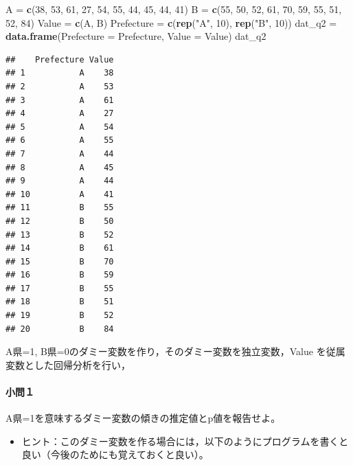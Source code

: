 \documentclass[]{article}
\newenvironment{Shaded}{\begin{snugshade}}{\end{snugshade}}
\newcommand{\KeywordTok}[1]{\textcolor[rgb]{0.13,0.29,0.53}{\textbf{#1}}}
\newcommand{\DataTypeTok}[1]{\textcolor[rgb]{0.13,0.29,0.53}{#1}}
\newcommand{\DecValTok}[1]{\textcolor[rgb]{0.00,0.00,0.81}{#1}}
\newcommand{\StringTok}[1]{\textcolor[rgb]{0.31,0.60,0.02}{#1}}
\newcommand{\NormalTok}[1]{#1}
\providecommand{\tightlist}{%
  \setlength{\itemsep}{0pt}\setlength{\parskip}{0pt}}
\let\oldparagraph\paragraph
\renewcommand{\paragraph}[1]{\oldparagraph{#1}\mbox{}}
\begin{document}
\begin{Shaded}
\begin{Highlighting}[]
\NormalTok{A =}\StringTok{ }\KeywordTok{c}\NormalTok{(}\DecValTok{38}\NormalTok{, }\DecValTok{53}\NormalTok{, }\DecValTok{61}\NormalTok{, }\DecValTok{27}\NormalTok{, }\DecValTok{54}\NormalTok{, }\DecValTok{55}\NormalTok{, }\DecValTok{44}\NormalTok{, }\DecValTok{45}\NormalTok{, }\DecValTok{44}\NormalTok{, }\DecValTok{41}\NormalTok{)}
\NormalTok{B =}\StringTok{ }\KeywordTok{c}\NormalTok{(}\DecValTok{55}\NormalTok{, }\DecValTok{50}\NormalTok{, }\DecValTok{52}\NormalTok{, }\DecValTok{61}\NormalTok{, }\DecValTok{70}\NormalTok{, }\DecValTok{59}\NormalTok{, }\DecValTok{55}\NormalTok{, }\DecValTok{51}\NormalTok{, }\DecValTok{52}\NormalTok{, }\DecValTok{84}\NormalTok{)}
\NormalTok{Value =}\StringTok{ }\KeywordTok{c}\NormalTok{(A, B)}
\NormalTok{Prefecture =}\StringTok{ }\KeywordTok{c}\NormalTok{(}\KeywordTok{rep}\NormalTok{(}\StringTok{"A"}\NormalTok{, }\DecValTok{10}\NormalTok{), }\KeywordTok{rep}\NormalTok{(}\StringTok{"B"}\NormalTok{, }\DecValTok{10}\NormalTok{))}
\NormalTok{dat_q2 =}\StringTok{ }\KeywordTok{data.frame}\NormalTok{(}\DataTypeTok{Prefecture =}\NormalTok{ Prefecture, }\DataTypeTok{Value =}\NormalTok{ Value)}
\NormalTok{dat_q2}
\end{Highlighting}
\end{Shaded}

\begin{verbatim}
##    Prefecture Value
## 1           A    38
## 2           A    53
## 3           A    61
## 4           A    27
## 5           A    54
## 6           A    55
## 7           A    44
## 8           A    45
## 9           A    44
## 10          A    41
## 11          B    55
## 12          B    50
## 13          B    52
## 14          B    61
## 15          B    70
## 16          B    59
## 17          B    55
## 18          B    51
## 19          B    52
## 20          B    84
\end{verbatim}

A県=1, B県=0のダミー変数を作り，そのダミー変数を独立変数，Value
を従属変数とした回帰分析を行い，

\paragraph{小問１}\label{-4}

A県=1を意味するダミー変数の傾きの推定値とp値を報告せよ。

\begin{itemize}
\tightlist
\item
  ヒント：このダミー変数を作る場合には，以下のようにプログラムを書くと良い（今後のためにも覚えておくと良い）。
\end{itemize}
\end{document}
